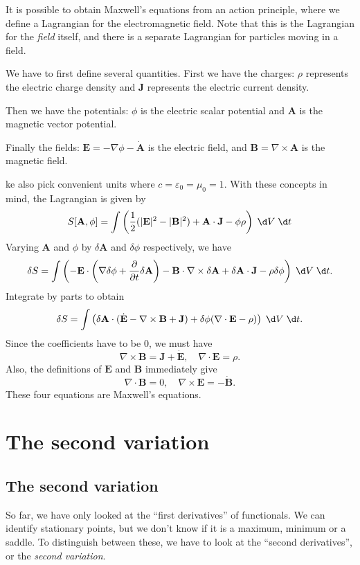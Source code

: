 \documentclass[a4paper]{article}
\begin{document}
\begin{eg}
  It is possible to obtain Maxwell's equations from an action principle, where we define a Lagrangian for the electromagnetic field. Note that this is the Lagrangian for the \emph{field} itself, and there is a separate Lagrangian for particles moving in a field.

  We have to first define several quantities. First we have the charges: $\rho$ represents the electric charge density and $\mathbf{J}$ represents the electric current density.

  Then we have the potentials: $\phi$ is the electric scalar potential and $\mathbf{A}$ is the magnetic vector potential.

  Finally the fields: $\mathbf{E} = -\nabla \phi - \dot{\mathbf{A}}$ is the electric field, and $\mathbf{B} = \nabla\times \mathbf{A}$ is the magnetic field.

  ke also pick convenient units where $c = \varepsilon_0 = \mu_0 = 1$. With these concepts in mind, the Lagrangian is given by
  \[
    S[\mathbf{A}, \phi] = \int \left(\frac{1}{2}(|\mathbf{E}|^2 - |\mathbf{B}|^2) + \mathbf{A}\cdot \mathbf{J} - \phi \rho\right)\;\d V\;\d t
  \]
  Varying $\mathbf{A}$ and $\phi$ by $\delta \mathbf{A}$ and $\delta \phi$ respectively, we have
  \[
    \delta S = \int \left(-\mathbf{E}\cdot \left(\nabla \delta\phi + \frac{\partial}{\partial t} \delta \mathbf{A}\right) - \mathbf{B}\cdot \nabla \times \delta \mathbf{A} + \delta \mathbf{A}\cdot \mathbf{J} - \rho\delta\phi\right)\;\d V\;\d t.
  \]
  Integrate by parts to obtain
  \[
    \delta S = \int\left(\delta\mathbf{A}\cdot (\dot{\mathbf{E}} - \nabla\times \mathbf{B} + \mathbf{J}) + \delta \phi(\nabla\cdot \mathbf{E} - \rho)\right)\;\d V\;\d t.
  \]
  Since the coefficients have to be $0$, we must have
  \[
    \nabla \times \mathbf{B} = \mathbf{J} + \dot{\mathbf{E}},\quad \nabla \cdot \mathbf{E} = \rho.
  \]
  Also, the definitions of $\mathbf{E}$ and $\mathbf{B}$ immediately give
  \[
    \nabla\cdot \mathbf{B} = 0,\quad \nabla \times \mathbf{E} = - \dot{\mathbf{B}}.
  \]
  These four equations are Maxwell's equations.
\end{eg}
\section{The second variation}
\subsection{The second variation}
So far, we have only looked at the ``first derivatives'' of functionals. We can identify stationary points, but we don't know if it is a maximum, minimum or a saddle. To distinguish between these, we have to look at the ``second derivatives'', or the \emph{second variation}.
\end{document}
